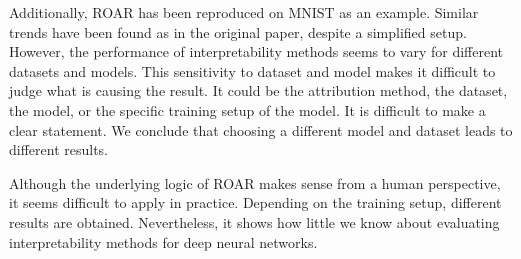Additionally, ROAR has been reproduced on MNIST as an example. Similar trends have been found as in the original paper\cite{hooker2019benchmark}, despite a simplified setup. However, the performance of interpretability methods seems to vary for different datasets and models. This sensitivity to dataset and model makes it difficult to judge what is causing the result. It could be the attribution method, the dataset, the model, or the specific training setup of the model. It is difficult to make a clear statement. We conclude that choosing a different model and dataset leads to different results.

Although the underlying logic of ROAR makes sense from a human perspective, it seems difficult to apply in practice. Depending on the training setup, different results are obtained. Nevertheless, it shows how little we know about evaluating interpretability methods for deep neural networks.





